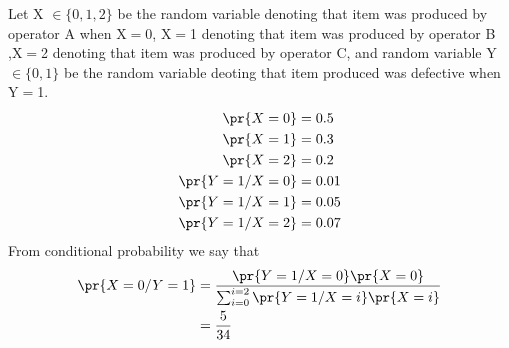 Let X $\in\{0,1,2\}$ be the random variable denoting that item was produced by operator A when X$=$0, X$=$1 denoting that item was produced by operator B ,X$=$2 denoting that item was produced by operator C, and random variable Y $\in\{0,1\}$ be the random variable deoting that item produced was  defective when Y$=$1.
\begin{align}
	\pr{X=0} &= 0.5 \\ 
    \pr{X=1} &= 0.3 \\ 
    \pr{X=2} &= 0.2 \\ 
	\pr{Y=1/X=0} &= 0.01\\
	\pr{Y=1/X=1} &= 0.05\\ 
	\pr{Y=1/X=2} &= 0.07
	\end{align}
	From conditional probability we say that \\
	\begin{align*}
	\pr{X=0/Y=1} &= \frac{\pr{Y=1/X=0}\pr{X=0}}{\sum_{i=0}^{i=2}\pr{Y=1/X=i}\pr{X=i}}\\
	&=\frac{5}{34}
	\end{align*}
